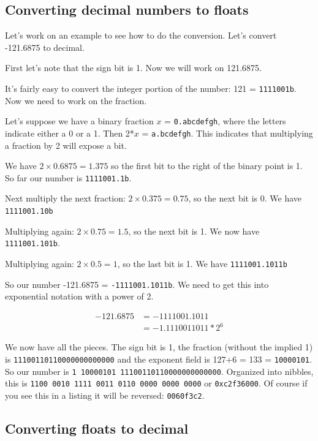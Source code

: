 \documentclass[11pt,b5paper]{book}
\begin{document}
\subsection{Converting decimal numbers to floats}

Let's work on an example to see how to do the conversion.
Let's convert -121.6875 to decimal.

First let's note that the sign bit is 1.
Now we will work on 121.6875.

It's fairly easy to convert the integer portion of the number: 121 = {\tt 1111001b}.
Now we need to work on the fraction.

Let's suppose we have a binary fraction $x$ = {\tt 0.abcdefgh}, where the letters indicate either a 0 or a 1.
Then 2*$x$ = {\tt a.bcdefgh}.
This indicates that multiplying a fraction by 2 will expose a bit.

We have $2 \times 0.6875 = 1.375$ so the first bit to the right of the binary point is 1.
So far our number is {\tt 1111001.1b}.

Next multiply the next fraction: $2 \times 0.375 = 0.75$, so the next bit is 0.
We have {\tt 1111001.10b}

Multiplying again: $2 \times 0.75 = 1.5$, so the next bit is 1.
We now have {\tt 1111001.101b}.

Multiplying again: $2 \times 0.5 = 1$, so the last bit is 1.
We have {\tt 1111001.1011b}

So our number -121.6875 = {\tt -1111001.1011b}.
We need to get this into exponential notation with a power of 2.

\begin{center}
\begin{align*}
  -121.6875 &= -1111001.1011 \\
            &= -1.1110011011 * 2^6
\end{align*}
\end{center}

We now have all the pieces.
The sign bit is 1, the fraction (without the implied 1) is {\tt 11100110110000000000000} and the exponent field
is 127+6 = 133 = {\tt 10000101}.
So our number is {\tt 1 10000101 11100110110000000000000}.
Organized into nibbles, this is {\tt 1100 0010 1111 0011 0110 0000 0000 0000} or {\tt 0xc2f36000}.
Of course if you see this in a listing it will be reversed: {\tt 0060f3c2}.

\subsection{Converting floats to decimal}
\end{document}
